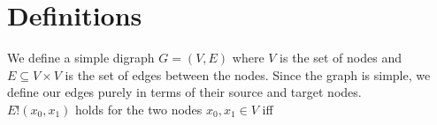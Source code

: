 \section{Definitions}
\label{sec:Definitions}
We define a simple digraph $G = (V,E)$ where $V$ is the set of nodes and $E \subseteq V \times V$ is the set of edges between the nodes.
Since the graph is simple, we define our edges purely in terms of their source and target nodes.\\

$E!(x_0, x_1)$ holds for the two nodes $x_0,x_1 \in V$ iff
